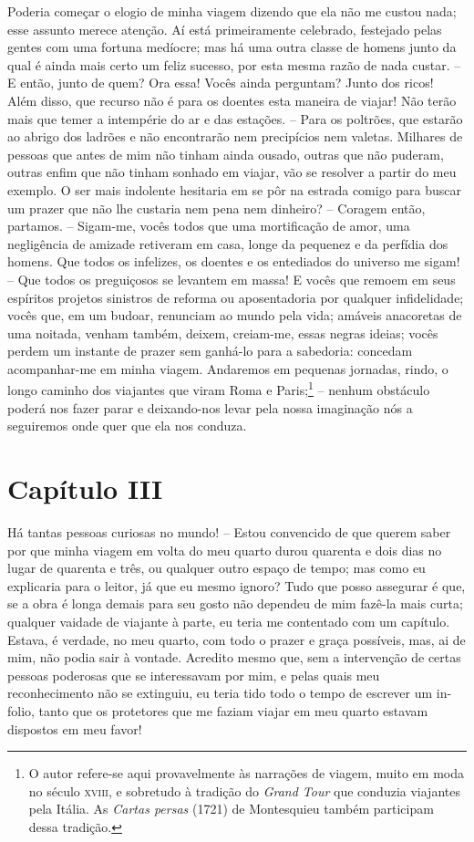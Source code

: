  Poderia começar o elogio de minha viagem dizendo que ela não me custou
nada; esse assunto merece atenção. Aí está primeiramente celebrado,
festejado pelas gentes com uma fortuna medíocre; mas há uma outra
classe de homens junto da qual é ainda mais certo um feliz sucesso, por
esta mesma razão de nada custar. -- E então, junto de quem? Ora essa!
Vocês ainda perguntam? Junto dos ricos! Além disso, que recurso não é
para os doentes esta maneira de viajar! Não terão mais que temer a
intempérie do ar e das estações. -- Para os poltrões, que estarão ao
abrigo dos ladrões e não encontrarão nem precipícios nem valetas.
Milhares de pessoas que antes de mim não tinham ainda ousado, outras
que não puderam, outras enfim que não tinham sonhado em viajar, vão se
resolver a partir do meu exemplo. O ser mais indolente hesitaria em se
pôr na estrada comigo para buscar um prazer que não lhe custaria nem
pena nem dinheiro? -- Coragem então, partamos. -- Sigam-me, vocês
todos que uma mortificação de amor, uma negligência de amizade
retiveram em casa, longe da pequenez e da perfídia dos homens. Que
todos os infelizes, os doentes e os entediados do universo me sigam!
-- Que todos os preguiçosos se levantem em massa! E vocês que remoem
em seus espíritos projetos sinistros de reforma ou aposentadoria por
qualquer infidelidade; vocês que, em um budoar, renunciam ao mundo pela
vida; amáveis anacoretas de uma noitada, venham também, deixem,
creiam-me, essas negras ideias; vocês perdem um instante de prazer sem
ganhá-lo para a sabedoria: concedam acompanhar-me em minha viagem.
Andaremos em pequenas jornadas, rindo, o longo caminho dos viajantes
que viram Roma e Paris;\footnote{ O autor refere-se aqui provavelmente
às narrações de viagem, muito em moda no século \textsc{xviii}, e sobretudo à
tradição do \textit{Grand Tour} que conduzia viajantes pela Itália. As
\textit{Cartas persas} (1721) de Montesquieu também participam dessa
tradição.} -- nenhum obstáculo poderá nos fazer parar e
deixando-nos levar pela nossa imaginação nós a seguiremos onde quer que
ela nos conduza.

\section*{Capítulo III}

Há tantas pessoas curiosas no mundo! -- Estou convencido de que querem
saber por que minha viagem em volta do meu quarto durou quarenta e dois
dias no lugar de quarenta e três, ou qualquer outro espaço de tempo;
mas como eu explicaria para o leitor, já que eu mesmo ignoro? Tudo que
posso assegurar é que, se a obra é longa demais para seu gosto não
dependeu de mim fazê-la mais curta; qualquer vaidade de viajante à
parte, eu teria me contentado com um capítulo. Estava, é verdade, no
meu quarto, com todo o prazer e graça possíveis, mas, ai de mim, não
podia sair à vontade. Acredito mesmo que, sem a intervenção de certas
pessoas poderosas que se interessavam por mim, e pelas quais meu
reconhecimento não se extinguiu, eu teria tido todo o tempo de escrever
um in-folio, tanto que os protetores que me faziam viajar em meu quarto
estavam dispostos em meu favor!

